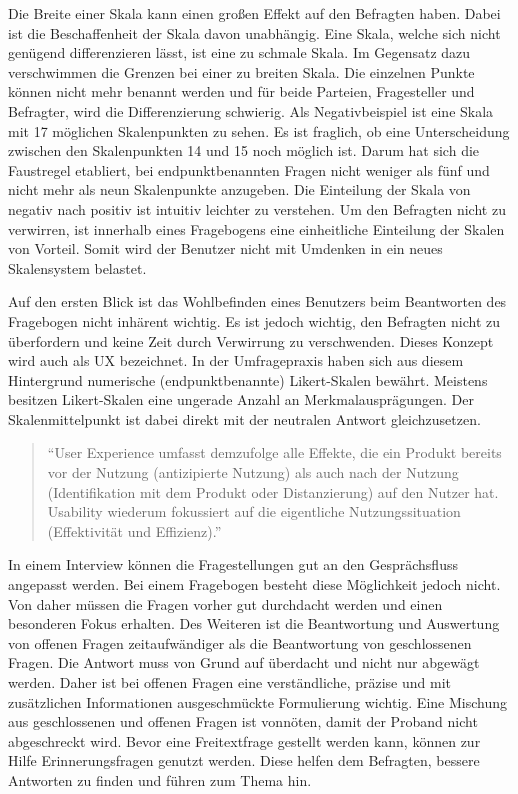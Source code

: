 Die Breite einer Skala kann einen großen Effekt auf den Befragten haben.
Dabei ist die Beschaffenheit der Skala davon unabhängig.
Eine Skala, welche sich nicht genügend differenzieren lässt, ist eine zu schmale Skala.
Im Gegensatz dazu verschwimmen die Grenzen bei einer zu breiten Skala.
Die einzelnen Punkte können nicht mehr benannt werden und für beide Parteien, Fragesteller und Befragter, wird die Differenzierung schwierig. \newline
Als Negativbeispiel ist eine Skala mit 17 möglichen Skalenpunkten zu sehen.
Es ist fraglich, ob eine Unterscheidung zwischen den Skalenpunkten 14 und 15 noch möglich ist.
Darum hat sich die Faustregel etabliert, bei endpunktbenannten Fragen nicht weniger als fünf und nicht mehr als neun Skalenpunkte anzugeben.\autocite[Vgl.][S. 87]{2014Fragebogen} %
Die Einteilung der Skala von negativ nach positiv ist intuitiv leichter zu verstehen.
Um den Befragten nicht zu verwirren, ist innerhalb eines Fragebogens eine einheitliche Einteilung der Skalen von Vorteil.
Somit wird der Benutzer nicht mit Umdenken in ein neues Skalensystem belastet.\autocite[Vgl.][S. 89 f]{2014Fragebogen} %

Auf den ersten Blick ist das Wohlbefinden eines Benutzers beim Beantworten des Fragebogen nicht inhärent wichtig.
Es ist jedoch wichtig, den Befragten nicht zu überfordern und keine Zeit durch Verwirrung zu verschwenden.
Dieses Konzept wird auch als \acf*{UX} bezeichnet.
In der Umfragepraxis haben sich aus diesem Hintergrund numerische (endpunktbenannte) Likert-Skalen bewährt.\autocite[Vgl.][]{Likert}
Meistens besitzen Likert-Skalen eine ungerade Anzahl an Merkmalausprägungen.
Der Skalenmittelpunkt ist dabei direkt mit der neutralen Antwort gleichzusetzen.\autocite[Vgl.][]{ISO}

\begin{quote}
	\enquote{User Experience umfasst demzufolge alle Effekte, die ein Produkt bereits vor der Nutzung (antizipierte Nutzung) als auch nach der Nutzung (Identifikation mit dem Produkt oder Distanzierung) auf den Nutzer hat. Usability wiederum fokussiert auf die eigentliche Nutzungssituation (Effektivität und Effizienz).}\autocite[Siehe][]{User}
\end{quote}

In einem Interview können die Fragestellungen gut an den Gesprächsfluss angepasst werden.
Bei einem Fragebogen besteht diese Möglichkeit jedoch nicht.
Von daher müssen die Fragen vorher gut durchdacht werden und einen besonderen Fokus erhalten.
Des Weiteren ist die Beantwortung und Auswertung von offenen Fragen zeitaufwändiger als die Beantwortung von geschlossenen Fragen.
Die Antwort muss von Grund auf überdacht und nicht nur abgewägt werden.
Daher ist bei offenen Fragen eine verständliche, präzise und mit zusätzlichen Informationen ausgeschmückte Formulierung wichtig.
Eine Mischung aus geschlossenen und offenen Fragen ist vonnöten, damit der Proband nicht abgeschreckt wird.
Bevor eine Freitextfrage gestellt werden kann, können zur Hilfe Erinnerungsfragen genutzt werden.
Diese helfen dem Befragten, bessere Antworten zu finden und führen zum Thema hin.\autocite[Vgl.][S. 35]{2009Fragebogen}
